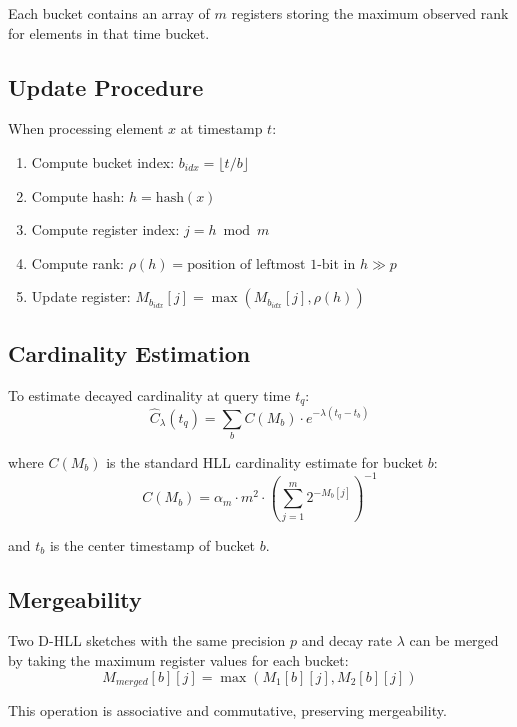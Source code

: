 \documentclass{article}
\begin{document}
Each bucket contains an array of $m$ registers storing the maximum observed rank for elements in that time bucket.

\subsection{Update Procedure}

When processing element $x$ at timestamp $t$:
\begin{enumerate}
    \item Compute bucket index: $b_{idx} = \lfloor t / b \rfloor$
    \item Compute hash: $h = \text{hash}(x)$
    \item Compute register index: $j = h \bmod m$
    \item Compute rank: $\rho(h) = \text{position of leftmost 1-bit in } h \gg p$
    \item Update register: $M_{b_{idx}}[j] = \max(M_{b_{idx}}[j], \rho(h))$
\end{enumerate}

\subsection{Cardinality Estimation}

To estimate decayed cardinality at query time $t_q$:
\begin{equation}
\hat{C}_\lambda(t_q) = \sum_{b} C(M_b) \cdot e^{-\lambda(t_q - t_b)}
\end{equation}

where $C(M_b)$ is the standard HLL cardinality estimate for bucket $b$:
\begin{equation}
C(M_b) = \alpha_m \cdot m^2 \cdot \left(\sum_{j=1}^{m} 2^{-M_b[j]}\right)^{-1}
\end{equation}

and $t_b$ is the center timestamp of bucket $b$.

\subsection{Mergeability}

Two D-HLL sketches with the same precision $p$ and decay rate $\lambda$ can be merged by taking the maximum register values for each bucket:
\begin{equation}
M_{merged}[b][j] = \max(M_1[b][j], M_2[b][j])
\end{equation}

This operation is associative and commutative, preserving mergeability.
\end{document}
